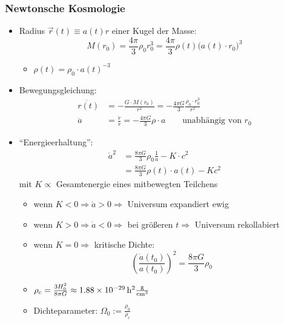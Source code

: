 \subsubsection{Newtonsche Kosmologie}
\begin{itemize}
	\item Radius $\vec{r}(t)\equiv a(t)r$ einer Kugel der Masse:
		\begin{equation*}
			M(r_0)=\frac{4\pi}{3}\rho_0r_0^3=\frac{4\pi}{3}\rho(t)\big(a(t)\cdot r_0\big)^3
		\end{equation*}
		\begin{itemize}
			\item $\rho(t)=\rho_0\cdot a(t)^{-3}$
		\end{itemize}
	\item Bewegungsgleichung:
		\begin{align*}
			\ddot{r(t)}&=-\frac{G\cdot M(r_0)}{r^2}=-\frac{4\pi G}{3}\frac{\rho_0\cdot r_0^3}{r^2}\\
			\ddot{a}&=\frac{\ddot{r}}{r}=-\frac{4\pi G}{3}\rho\cdot a\qquad\text{unabhängig von $r_0$}
		\end{align*}
	\item "`Energieerhaltung"':
		\begin{align*}
			\dot{a}^2&=\frac{8\pi G}{3}\rho_0\frac{1}{a}-K\cdot c^2\\
			&=\frac{8\pi G}{3}\rho(t)\cdot a(t)-Kc^2
		\end{align*}
		mit $K\propto $ Gesamtenergie eines mitbewegten Teilchens
		\begin{itemize}[label={$\cdot$}]
			\item wenn $K<0\Rightarrow \dot{a}>0\Rightarrow$ Universum expandiert ewig
			\item wenn $K>0\Rightarrow \dot{a}<0\Rightarrow$ bei größeren $t\Rightarrow$ Universum rekollabiert
			\item wenn $K=0\Rightarrow$ kritische Dichte:
				\begin{equation*}
					\left(\frac{\dot{a}(t_0)}{a(t_0)}\right)^2=\frac{8\pi G}{3}\rho_0
				\end{equation*}
		\end{itemize}
		\begin{itemize}
			\item $\rho_c=\frac{3H_0^2}{8\pi G}\approx\SI{1.88e-29}{h^2\frac{\g}{\cm^3}}$
			\item Dichteparameter: $\Omega_0:=\frac{\rho_0}{\rho_c}$
		\end{itemize}
\end{itemize}
